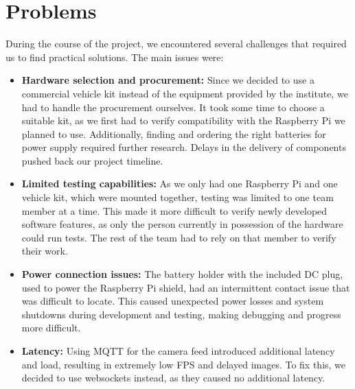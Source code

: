 \section{Problems}


During the course of the project, we encountered several challenges that required us to find practical solutions. The main issues were:

\begin{itemize}
    \item \textbf{Hardware selection and procurement:}
    Since we decided to use a commercial vehicle kit instead of the equipment provided by the institute, we had to handle the procurement ourselves. It took some time to choose a suitable kit, as we first had to verify compatibility with the Raspberry Pi we planned to use. Additionally, finding and ordering the right batteries for power supply required further research. Delays in the delivery of components pushed back our project timeline.

    \item \textbf{Limited testing capabilities:}
    As we only had one Raspberry Pi and one vehicle kit, which were mounted together, testing was limited to one team member at a time. This made it more difficult to verify newly developed software features, as only the person currently in possession of the hardware could run tests. The rest of the team had to rely on that member to verify their work.

    \item \textbf{Power connection issues:}
    The battery holder with the included DC plug, used to power the Raspberry Pi shield, had an intermittent contact issue that was difficult to locate. This caused unexpected power losses and system shutdowns during development and testing, making debugging and progress more difficult.

    \item \textbf{Latency:}
    Using MQTT for the camera feed introduced additional latency and load, resulting in extremely low FPS and delayed images.
    To fix this, we decided to use websockets instead, as they caused no additional latency.
\end{itemize}